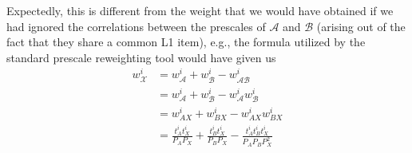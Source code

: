Expectedly, this is different from the weight that we would have obtained if we had ignored the correlations between the prescales of $\mathcal{A}$ and $\mathcal{B}$ (arising out of the fact that they share a common L1 item), e.g., the formula utilized by the standard prescale reweighting tool \cite{Buttinger:2014726} would have given us
\begin{align}
    w^i_{\mathcal{X}}&=w^i_{\mathcal{A}}+w^i_{\mathcal{B}}-w^i_{\mathcal{AB}}\\
    &=w^i_{\mathcal{A}}+w^i_{\mathcal{B}}-w^i_{\mathcal{A}}w^i_{\mathcal{B}}\\
    &=w^i_{AX}+w^i_{BX}-w^i_{AX}w^i_{BX}\\
    &=\frac{t^i_At^i_X}{P_A P_X}+\frac{t^i_Bt^i_X}{P_B P_X}-\frac{t^i_At^i_Bt^i_X}{P_A P_B P^2_X}
\end{align}
